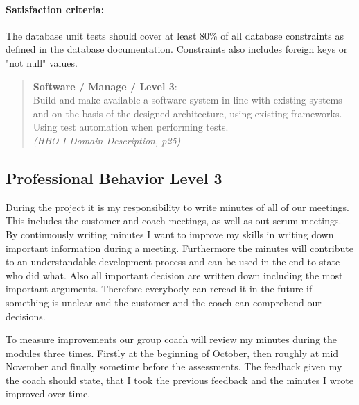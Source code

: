 \paragraph{Satisfaction criteria:} The database unit tests should cover at least 80\% of all database constraints as defined in the database documentation. Constraints also includes foreign keys or "not null" values.

\begin{minipage}{\textwidth}
\begin{quote}
	\textbf{Software / Manage / Level 3}: \\
	Build and make available a software system in line with existing systems and on the basis of the designed architecture, using existing frameworks.
	Using test automation when performing tests.
	\\ \textit{(HBO-I Domain Description, p25)}
\end{quote}
\end{minipage}



\subsection{Professional Behavior Level 3}

During the project it is my responsibility to write minutes of all of our meetings. This includes the customer and coach meetings, as well as out scrum meetings. 
By continuously writing minutes I want to improve my skills in writing down important information during a meeting. Furthermore the minutes will contribute to an understandable development process and can be used in the end to state who did what.
Also all important decision are written down including the most important arguments. Therefore everybody can reread it in the future if something is unclear and the customer and the coach can comprehend our decisions.

To measure improvements our group coach will review my minutes during the modules three times. Firstly at the beginning of October, then roughly at mid November and finally sometime before the assessments. The feedback given my the coach should state, that I took the previous feedback and the minutes I wrote improved over time.